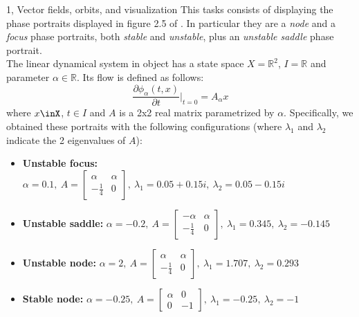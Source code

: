 \documentclass[10pt,a4paper]{article}
\begin{document}
\frontpage

\begin{task}{1, Vector fields, orbits, and visualization}
This tasks consists of displaying the phase portraits displayed in figure 2.5 of \cite{kuznetsov}.
In particular they are a \textit{node} and a \textit{focus} phase portraits, both \textit{stable} and \textit{unstable}, plus an \textit{unstable saddle} phase portrait.\\
The linear dynamical system in object has a state space $X=\mathbb{R}^2$, $I=\mathbb{R}$ and parameter $\alpha\in\mathbb{R}$.
Its flow is defined as follows:
\begin{equation}\label{eq:sys-task1}
    \frac{\partial\phi_{\alpha}(t,x)}{\partial t}\Bigr|_{t=0}=A_{\alpha}x
\end{equation}
where $x\inX$, $t\in I$ and $A$ is a 2x2 real matrix parametrized by $\alpha$.
Specifically, we obtained these portraits with the following configurations
(where $\lambda_1$ and $\lambda_2$ indicate the 2 eigenvalues of $A$):
\begin{itemize}
    \item \textbf{Unstable focus:} $\alpha=0.1,\ A=
    \begin{bmatrix}
    \alpha & \alpha \\
    -\frac{1}{4} & 0
    \end{bmatrix},\
    \lambda_1 = 0.05+0.15i,\ \lambda_2 = 0.05-0.15i$
    
    \item \textbf{Unstable saddle:} $\alpha=-0.2,\ A=
    \begin{bmatrix}
    -\alpha & \alpha \\
    -\frac{1}{4} & 0
    \end{bmatrix},\
    \lambda_1 = 0.345,\ \lambda_2 = -0.145$
    
    \item \textbf{Unstable node:} $\alpha=2,\ A=
    \begin{bmatrix}
    \alpha & \alpha \\
    -\frac{1}{4} & 0
    \end{bmatrix},\
    \lambda_1 = 1.707,\ \lambda_2 = 0.293$
    
    \item \textbf{Stable node:} $\alpha=-0.25,\ A=
    \begin{bmatrix}
    \alpha & 0 \\
    0 & -1
    \end{bmatrix},\
    \lambda_1 = -0.25,\ \lambda_2 = -1$
    

\end{itemize}
\end{task}
\end{document}
